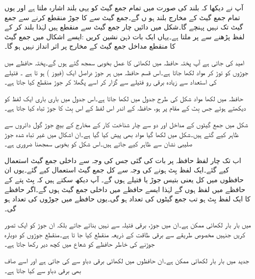 آپ نے دیکھا کہ    بلند  کی صورت میں تمام جمع گیٹ کو یہی بلند اشارہ ملتا ہے اور یوں تمام جمع گیٹ کے مخارج بلند ہو ں گے۔جمع گیٹ سے    کا جوڑ منقطع  کرنے سے     جمع گیٹ تک نہیں  پہنچے  گا۔شکل  میں دائیں چار جمع گیٹ  سے منقطع  ہیں لہٰذا  بلند کر کے لفظ  پڑھنے سے    پر  ملتا ہے۔یہاں ایک بات ذہن  نشین کریں :ایسے اشکال میں  جمع گیٹ کا منقطع مداخل جمع گیٹ کے مخارج پر اثر  انداز نہیں ہو گا۔

امید کی جاتی ہے آپ پختہ حافظہ میں لکھائی کا عمل بخوبی سمجھ گئے ہوں گے۔پختہ حافظے میں  جوڑوں کو توڑ کر مواد لکھا جاتا ہے۔اس قسم حافظہ میں ہر جوڑ دراصل ایک (فیوز  ) ہو تا ہے ۔ فتیلے  کی استعداد  سے زیادہ برقی رو  فتیلے سے گزار کر اسے پگھلا کر  جوڑ   منقطع  کیا   جاتا ہے۔


حافظہ میں  لکھا  مواد شکل کی طرح جدول میں لکھا جاتا ہے۔اس جدول میں    باری باری ایک لفظ کو  دیکھتے ہوئے جس بِٹ کے مقام پر  ہو،  حافظہ کے اندر اس لفظ کے اس بِٹ کا جوڑ تباہ کیا جاتا ہے۔


شکل  میں  جمع گیٹوں کے مداخل اور دو سے چار شناخت کار کے مخارج کے  بیچ جوڑ گول دائروں سے  ظاہر کیے  گئے ہیں۔شکل  میں لکھا گیا مواد   بھی   پیش کیا گیا ہے۔ان  اشکال میں غیر تباہ شدہ جوڑ  صلیبی نشان   سے ظاہر کیے  جاتے ہیں۔اس شکل کو بخوبی سمجھنا  ضروری ہے۔

اب تک  چار لفظ  حافظہ  پر بات کی گئی جس کی وجہ سے   داخلی جمع گیٹ استعمال کیے گئے۔ایک لفظ   بِٹ ہونے کی وجہ سے کل   جمع گیٹ استعمال کیے گئے۔یوں  ان حافظوں  میں کل  یعنی  بتیس    جوڑ یا  فتیلے  ہوں گے۔ آپ دیکھ سکتے ہیں کہ  بِٹ پتے    کے حافظے میں   لفظ ہوں گے لہٰذا ایسے حافظے میں   داخلی جمع گیٹ  ہوں گے۔اگر حافظے  کا ایک لفظ  بِٹ ہو تب جمع گیٹوں کی تعداد  ہو گی۔یوں حافظے میں جوڑوں کی تعداد   ہو گی۔

 میں بار بار لکھائی ممکن ہے۔ان  میں   جوڑ، برقی فتیلہ سے نہیں بنائے جاتے بلکہ ان   جوڑ کو ایک تصور  کریں جنہیں مخصوص طریقے سے برقی طاقت کے ذریعہ منقطع کیا جا تا ہے۔منقطع جوڑوں کو دوبارہ جوڑنے کی خاطر حافظے  کو شعاع  میں کچھ دیر رکھا جاتا ہے۔

جدید میں  بار بار لکھائی ممکن ہے۔ان حافظوں میں لکھائی برقی دباو سے کی جاتی ہے اور اسے صاف بھی برقی دباو سے  کیا جاتا ہے۔


